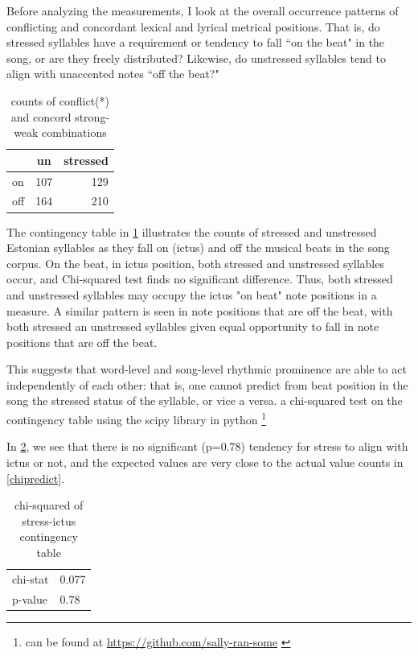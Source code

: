 Before analyzing the measurements, I look at the overall occurrence patterns of conflicting and concordant lexical and lyrical metrical positions. That is, do stressed syllables have a requirement or tendency to fall ``on the beat" in the song, or are they freely distributed? Likewise, do unstressed syllables tend to align with unaccented notes ``off the beat?" 


\begin{table}[ht]
\centering
\begin{tabular}{lcr}
\hline
 & un &   stressed \\
\hline
on  &   107 & 129 \\
off     &  164 & 210 \\
\hline
\end{tabular}
\label{contin}
\caption{counts of conflict(*) and concord strong-weak combinations}
\end{table}

The contingency table in \ref{contin} illustrates the counts of stressed and unstressed Estonian syllables as they fall on (ictus) and off the musical beats in the song corpus. On the beat, in ictus position, both stressed and unstressed syllables occur, and Chi-squared test finds no significant difference. Thus, both stressed and unstressed syllables may occupy the ictus "on beat" note positions in a measure. A similar pattern is seen in note positions that are off the beat, with both stressed an unstressed syllables given equal opportunity to fall in note positions that are off the beat. 

This suggests that word-level and song-level rhythmic prominence are able to act independently of each other: that is, one cannot predict from beat position in the song the stressed status of the syllable, or vice a versa. 
a chi-squared test on the contingency table using the scipy library in python \citep{2020SciPy-NMeth, mckinney-proc-scipy-2010}\footnote{\citep{reback2020pandas} can be found at \url{https://github.com/sally-ran-some} \citep{Kluyver2016jupyter}}


In \ref{chicont}, we see that there is no significant (p=0.78) tendency for stress to align with ictus or not,  and the expected values are very close to the actual value counts in \ref{chipredict}.


\begin{table}[htb]
\caption{chi-squared of stress-ictus contingency table}
\begin{center}
\begin{tabular}{ll}
\hline
chi-stat & 0.077 \\
p-value &  0.78 \\
\hline
\end{tabular}
\end{center}
\label{chicont}
\end{table}%


